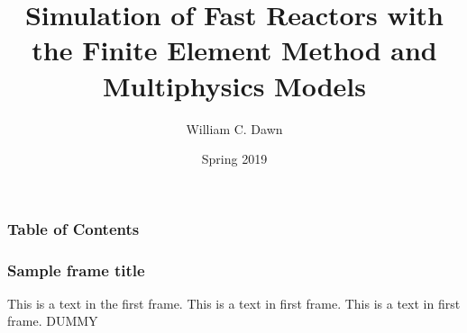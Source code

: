 \documentclass[professionalfont]{beamer}
\title{Simulation of Fast Reactors with the Finite Element Method and
Multiphysics Models}
\author{William C. Dawn}
\institute{North Carolina State University}
\date{Spring 2019}
\begin{document}
\begin{frame}
  \titlepage
\end{frame}

\begin{frame}
  \frametitle{Table of Contents}
  \tableofcontents
\end{frame}

\begin{frame}
  \frametitle{Sample frame title}
  This is a text in the first frame. This is a text in first frame. This is a
  text in first frame. DUMMY
\end{frame}
\end{document}
